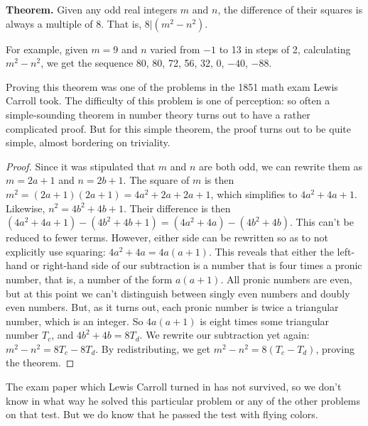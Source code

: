 \documentclass[12pt]{article}
\begin{document}
{\bf Theorem.} Given any odd real integers $m$ and $n$, the difference of their squares is always a multiple of 8. That is, $8 |  (m^2 - n^2)$.

For example, given $m = 9$ and $n$ varied from $-1$ to 13 in steps of 2, calculating $m^2 - n^2$, we get the sequence 80, 80, 72, 56, 32, 0, $-40$, $-88$.

Proving this theorem was one of the problems in the 1851 math exam Lewis Carroll took. The difficulty of this problem is one of perception: so often a simple-sounding theorem in number theory turns out to have a rather complicated proof. But for this simple theorem, the proof turns out to be quite simple, almost bordering on triviality.

\begin{proof}
Since it was stipulated that $m$ and $n$ are both odd, we can rewrite them as $m = 2a + 1$ and $n = 2b + 1$. The square of $m$ is then $m^2 = (2a + 1)(2a + 1) = 4a^2 + 2a + 2a + 1$, which simplifies to $4a^2 + 4a + 1$. Likewise, $n^2 = 4b^2 + 4b + 1$. Their difference is then $(4a^2 + 4a + 1) - (4b^2 + 4b + 1) = (4a^2 + 4a) - (4b^2 + 4b)$. This can't be reduced to fewer terms. However, either side can be rewritten so as to not explicitly use squaring: $4a^2 + 4a = 4a(a + 1)$. This reveals that either the left-hand or right-hand side of our subtraction is a number that is four times a pronic number, that is, a number of the form $a(a + 1)$. All pronic numbers are even, but at this point we can't distinguish between singly even numbers and doubly even numbers. But, as it turns out, each pronic number is twice a triangular number, which is an integer. So $4a(a + 1)$ is eight times some triangular number $T_c$, and $4b^2 + 4b = 8T_d$. We rewrite our subtraction yet again: $m^2 - n^2 = 8T_c - 8T_d$. By redistributing, we get $m^2 - n^2 = 8(T_c - T_d)$, proving the theorem.
\end{proof}

The exam paper which Lewis Carroll turned in has not survived, so we don't know in what way he solved this particular problem or any of the other problems on that test. But we do know that he passed the test with flying colors.

\end{document}
